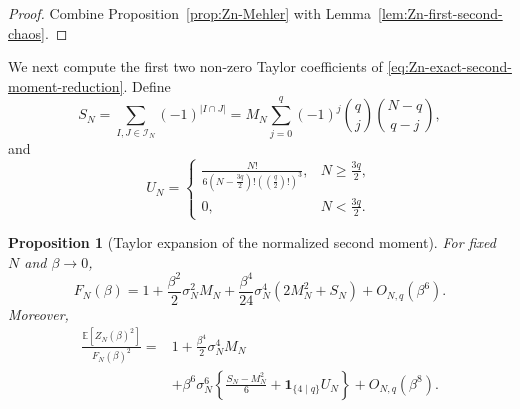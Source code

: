 \documentclass[11pt]{article}
\newtheorem{proposition}{Proposition}
\newcommand{\E}{\mathbb{E}}
\newcommand{\calI}{\mathcal{I}}
\newcommand{\ind}{\mathbf{1}}
\begin{document}
\begin{proof}
  Combine Proposition~\ref{prop:Zn-Mehler} with
  Lemma~\ref{lem:Zn-first-second-chaos}.
\end{proof}

We next compute the first two non-zero Taylor coefficients of
\eqref{eq:Zn-exact-second-moment-reduction}.  Define
\begin{equation}\label{eq:Sn-sign-sum}
  S_N
  =
  \sum_{I,J\in\calI_N}(-1)^{|I\cap J|}
  =
  M_N
  \sum_{j=0}^q
    (-1)^j
    \binom qj
    \binom{N-q}{q-j},
\end{equation}
and
\begin{equation}\label{eq:Un-triples}
  U_N
  =
  \begin{cases}
    \displaystyle
    \frac{N!}{
      6\left(N-\frac{3q}{2}\right)!
      \left(\left(\frac q2\right)!\right)^3
    },
    & N\geq\frac{3q}{2},
    \\
    0,
    & N<\frac{3q}{2}.
  \end{cases}
\end{equation}

\begin{proposition}[Taylor expansion of the normalized second moment]
  \label{prop:Zn2-Taylor-expansion}
  For fixed $N$ and $\beta\to0$,
  \begin{equation}\label{eq:Fn-Taylor-expansion}
    F_N(\beta)
    =
    1
    +
    \frac{\beta^2}{2}\sigma_N^2M_N
    +
    \frac{\beta^4}{24}\sigma_N^4
    \left(
      2M_N^2+S_N
    \right)
    +
    O_{N,q}(\beta^6).
  \end{equation}
  Moreover,
  \begin{equation}\label{eq:Zn2-ratio-Taylor-expansion}
    \begin{aligned}
      \frac{\E[Z_N(\beta)^2]}{F_N(\beta)^2}
      ={}&
      1
      +
      \frac{\beta^4}{2}\sigma_N^4M_N
      \\
      &+
      \beta^6\sigma_N^6
      \left\{
        \frac{S_N-M_N^2}{6}
        +
        \ind_{\{4\mid q\}}U_N
      \right\}
      +
      O_{N,q}(\beta^8).
    \end{aligned}
  \end{equation}
\end{proposition}
\end{document}
